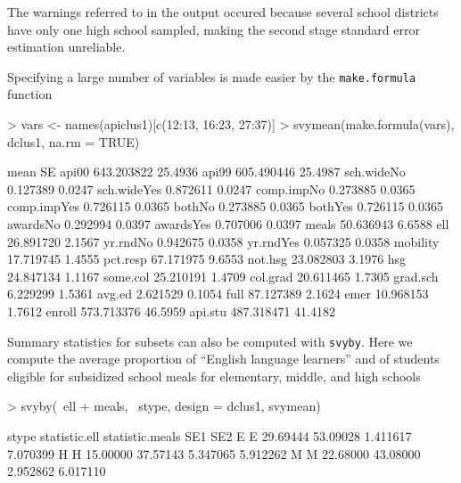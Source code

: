 \documentclass{article}
\begin{document}
The warnings referred to in the output occured because several
school districts have only one high school sampled, making the second
stage standard error estimation unreliable.

Specifying a large number of variables is made easier by the \texttt{make.formula} function
\begin{Schunk}
\begin{Sinput}
> vars <- names(apiclus1)[c(12:13, 16:23, 27:37)]
> svymean(make.formula(vars), dclus1, na.rm = TRUE)
\end{Sinput}
\begin{Soutput}
                  mean      SE
api00       643.203822 25.4936
api99       605.490446 25.4987
sch.wideNo    0.127389  0.0247
sch.wideYes   0.872611  0.0247
comp.impNo    0.273885  0.0365
comp.impYes   0.726115  0.0365
bothNo        0.273885  0.0365
bothYes       0.726115  0.0365
awardsNo      0.292994  0.0397
awardsYes     0.707006  0.0397
meals        50.636943  6.6588
ell          26.891720  2.1567
yr.rndNo      0.942675  0.0358
yr.rndYes     0.057325  0.0358
mobility     17.719745  1.4555
pct.resp     67.171975  9.6553
not.hsg      23.082803  3.1976
hsg          24.847134  1.1167
some.col     25.210191  1.4709
col.grad     20.611465  1.7305
grad.sch      6.229299  1.5361
avg.ed        2.621529  0.1054
full         87.127389  2.1624
emer         10.968153  1.7612
enroll      573.713376 46.5959
api.stu     487.318471 41.4182
\end{Soutput}
\end{Schunk}

Summary statistics for subsets can also be computed with
\texttt{svyby}. Here we compute the average proportion of ``English
language learners'' and of students eligible for subsidized school
meals for elementary, middle, and high schools
\begin{Schunk}
\begin{Sinput}
> svyby(~ell + meals, ~stype, design = dclus1, svymean)
\end{Sinput}
\begin{Soutput}
  stype statistic.ell statistic.meals      SE1      SE2
E     E      29.69444        53.09028 1.411617 7.070399
H     H      15.00000        37.57143 5.347065 5.912262
M     M      22.68000        43.08000 2.952862 6.017110
\end{Soutput}
\end{Schunk}
\end{document}
